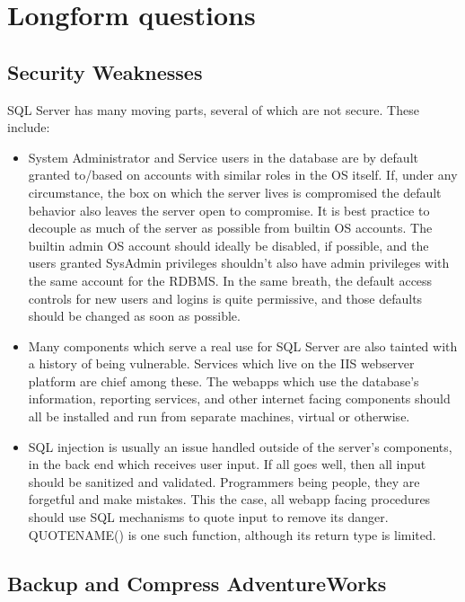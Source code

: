 \hypertarget{longform-questions}{%
\section{Longform questions}\label{longform-questions}}

\hypertarget{security-weaknesses}{%
\subsection{Security Weaknesses}\label{security-weaknesses}}

SQL Server has many moving parts, several of which are not secure. These
include:

\begin{itemize}
\item
  System Administrator and Service users in the database are by default
  granted to/based on accounts with similar roles in the OS itself. If,
  under any circumstance, the box on which the server lives is
  compromised the default behavior also leaves the server open to
  compromise. It is best practice to decouple as much of the server as
  possible from builtin OS accounts. The builtin admin OS account should
  ideally be disabled, if possible, and the users granted SysAdmin
  privileges shouldn't also have admin privileges with the same account
  for the RDBMS. In the same breath, the default access controls for new
  users and logins is quite permissive, and those defaults should be
  changed as soon as possible.
\item
  Many components which serve a real use for SQL Server are also tainted
  with a history of being vulnerable. Services which live on the IIS
  webserver platform are chief among these. The webapps which use the
  database's information, reporting services, and other internet facing
  components should all be installed and run from separate machines,
  virtual or otherwise.
\item
  SQL injection is usually an issue handled outside of the server's
  components, in the back end which receives user input. If all goes
  well, then all input should be sanitized and validated. Programmers
  being people, they are forgetful and make mistakes. This the case, all
  webapp facing procedures should use SQL mechanisms to quote input to
  remove its danger. QUOTENAME() is one such function, although its
  return type is limited.
\end{itemize}

\hypertarget{backup-and-compress-adventureworks}{%
\subsection{Backup and Compress
AdventureWorks}\label{backup-and-compress-adventureworks}}

